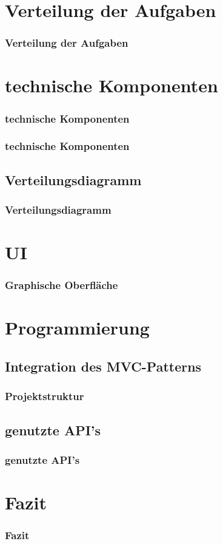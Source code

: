 \documentclass[11pt]{beamer}
\begin{document}
	\section{Verteilung der Aufgaben}
	\begin{frame}
		\frametitle{Verteilung der Aufgaben}
	\end{frame}

	\section{technische Komponenten}
	\begin{frame}
		\frametitle{technische Komponenten}
	\end{frame}	

	\begin{frame}
		\frametitle{technische Komponenten}
	\end{frame}

	\subsection{Verteilungsdiagramm}
	\begin{frame}
		\frametitle{Verteilungsdiagramm}
	\end{frame}

	\section{UI}
	\begin{frame}
		\frametitle{Graphische Oberfl\"ache}
	\end{frame}
		
	\section{Programmierung}
	\subsection{Integration des MVC-Patterns}
	\begin{frame}
		\frametitle{Projektstruktur}
	\end{frame}

	\subsection{genutzte API's}
	\begin{frame}
		\frametitle{genutzte API's}
	\end{frame}

	
	\section{Fazit}
	\begin{frame}
		\frametitle{Fazit}
	\end{frame}
\end{document}
